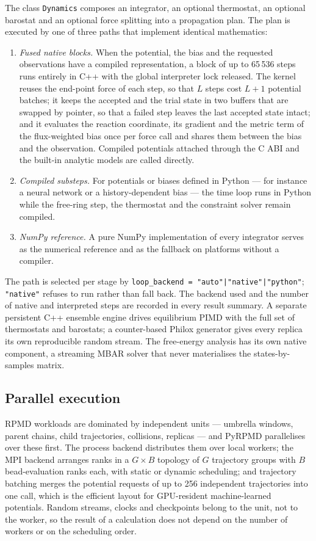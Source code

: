 \documentclass[preprint,12pt]{elsarticle}
\newcommand{\code}[1]{\texttt{#1}}
\begin{document}
The class \code{Dynamics} composes an integrator, an optional thermostat, an optional barostat and an optional force splitting into a propagation plan. The plan is executed by one of three paths that implement identical mathematics:
\begin{enumerate}
\item \emph{Fused native blocks.} When the potential, the bias and the requested observations have a compiled representation, a block of up to 65\,536 steps runs entirely in C++ with the global interpreter lock released. The kernel reuses the end-point force of each step, so that $L$ steps cost $L+1$ potential batches; it keeps the accepted and the trial state in two buffers that are swapped by pointer, so that a failed step leaves the last accepted state intact; and it evaluates the reaction coordinate, its gradient and the metric term of the flux-weighted bias once per force call and shares them between the bias and the observation. Compiled potentials attached through the C ABI and the built-in analytic models are called directly.
\item \emph{Compiled substeps.} For potentials or biases defined in Python --- for instance a neural network or a history-dependent bias --- the time loop runs in Python while the free-ring step, the thermostat and the constraint solver remain compiled.
\item \emph{NumPy reference.} A pure NumPy implementation of every integrator serves as the numerical reference and as the fallback on platforms without a compiler.
\end{enumerate}
The path is selected per stage by \code{loop\_backend = "auto"|"native"|"python"}; \code{"native"} refuses to run rather than fall back. The backend used and the number of native and interpreted steps are recorded in every result summary. A separate persistent C++ ensemble engine drives equilibrium PIMD with the full set of thermostats and barostats; a counter-based Philox generator gives every replica its own reproducible random stream. The free-energy analysis has its own native component, a streaming MBAR solver that never materialises the states-by-samples matrix.

\subsection{Parallel execution}

RPMD workloads are dominated by independent units --- umbrella windows, parent chains, child trajectories, collisions, replicas --- and PyRPMD parallelises over these first. The process backend distributes them over local workers; the MPI backend arranges ranks in a $G\times B$ topology of $G$ trajectory groups with $B$ bead-evaluation ranks each, with static or dynamic scheduling; and trajectory batching merges the potential requests of up to 256 independent trajectories into one call, which is the efficient layout for GPU-resident machine-learned potentials. Random streams, clocks and checkpoints belong to the unit, not to the worker, so the result of a calculation does not depend on the number of workers or on the scheduling order.
\end{document}
